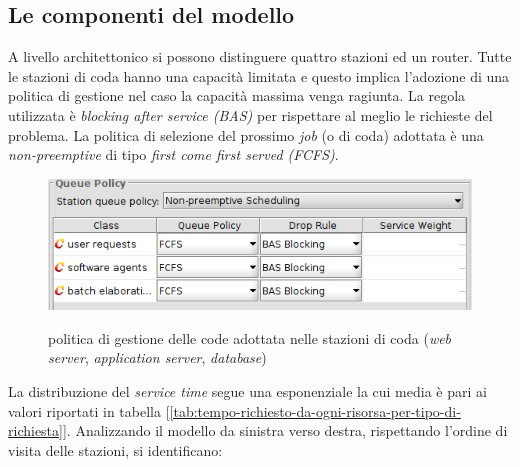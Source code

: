 \documentclass[../main.tex]{subfiles}
\begin{document}
    \subsection{Le componenti del modello}\label{subsec:le-componenti-del-modello}
    A livello architettonico si possono distinguere quattro stazioni ed un router.
    Tutte le stazioni di coda hanno una capacità limitata e questo implica l'adozione di una politica di gestione nel
    caso la capacità massima venga ragiunta.
    La regola utilizzata è \textit{blocking after service (BAS)} per rispettare al meglio le richieste del problema.
    La politica di selezione del prossimo \textit{job} (o di coda) adottata è una  \textit{non-preemptive} di tipo \textit{first come first served (FCFS)}.
    \begin{figure}[H]
        \centering
        \includegraphics[scale = 0.5]{assets/queue_policy.png}\\
        \caption[\textit{Politica} di gestione delle code]{ politica di gestione delle code adottata nelle stazioni di coda (\textit{web server}, \textit{application server}, \textit{database})}
        \label{fig:politica-di-coda}
    \end{figure}
    La distribuzione del \textit{service time} segue una esponenziale la cui media è pari ai valori riportati in tabella [\ref{tab:tempo-richiesto-da-ogni-risorsa-per-tipo-di-richiesta}].
    Analizzando il modello da sinistra verso destra, rispettando l'ordine di visita delle stazioni, si identificano:
\end{document}
